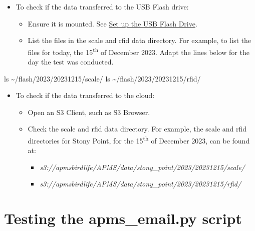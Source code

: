 \documentclass[
  letterpaper,
]{scrbook}
\newenvironment{Shaded}{\begin{snugshade}}{\end{snugshade}}
\newcommand{\FunctionTok}[1]{\textcolor[rgb]{0.28,0.35,0.67}{#1}}
\newcommand{\NormalTok}[1]{\textcolor[rgb]{0.00,0.23,0.31}{#1}}
\begin{document}
\begin{itemize}
\item
  To check if the data transferred to the USB Flash drive:

  \begin{itemize}
  \item
    Ensure it is mounted. See
    \hyperref[Setux5cux2520upux5cux2520theux5cux2520USBux5cux2520Flashux5cux2520Drive]{Set
    up the USB Flash Drive}.
  \item
    List the files in the scale and rfid data directory. For example, to
    list the files for today, the 15\textsuperscript{th} of December
    2023. Adapt the lines below for the day the test was conducted.
  \end{itemize}
\end{itemize}

\begin{Shaded}
\begin{Highlighting}[]
\FunctionTok{ls}\NormalTok{ \textasciitilde{}/flash/2023/20231215/scale/}
\FunctionTok{ls}\NormalTok{ \textasciitilde{}/flash/2023/20231215/rfid/}
\end{Highlighting}
\end{Shaded}

\begin{itemize}
\item
  To check if the data transferred to the cloud:

  \begin{itemize}
  \item
    Open an S3 Client, such as S3 Browser.
  \item
    Check the scale and rfid data directory. For example, the scale and
    rfid directories for Stony Point, for the 15\textsuperscript{th} of
    December 2023, can be found at:

    \begin{itemize}
    \item
      \emph{s3://apmsbirdlife/APMS/data/stony\_point/2023/20231215/scale/}
    \item
      \emph{s3://apmsbirdlife/APMS/data/stony\_point/2023/20231215/rfid/}
    \end{itemize}
  \end{itemize}
\end{itemize}

\section{Testing the apms\_email.py
script}\label{testing-the-apms_email.py-script}
\end{document}
